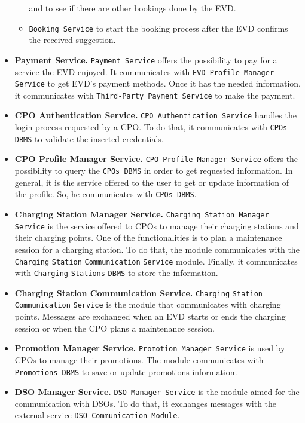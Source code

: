 \begin{itemize}
\begin{itemize}
        and to see if there are other bookings done by the EVD\@.
        \item \verb|Booking Service| to start the booking process after the EVD confirms the received suggestion.
    \end{itemize}
    \item \textbf{Payment Service.} \verb|Payment Service| offers the possibility to pay for a service the EVD enjoyed.
    It communicates with \verb|EVD Profile Manager Service| to get EVD's payment methods.
    Once it has the needed information, it communicates with \verb|Third-Party Payment Service| to make the payment.
    \item \textbf{CPO Authentication Service.} \verb|CPO Authentication Service| handles the login process requested by a CPO\@.
    To do that, it communicates with \verb|CPOs DBMS| to validate the inserted credentials.
    \item \textbf{CPO Profile Manager Service.} \verb|CPO Profile Manager Service| offers the possibility to query
    the \verb|CPOs DBMS| in order to get requested information.
    In general, it is the service offered to the user to get or update information of the profile.
    So, he communicates with \verb|CPOs DBMS|.
    \item \textbf{Charging Station Manager Service.} \verb|Charging Station Manager Service| is the service offered to CPOs
    to manage their charging stations and their charging points.
    One of the functionalities is to plan a maintenance session for a charging station.
    To do that, the module communicates with the \verb|Charging| \verb|Station| \verb|Communication| \verb|Service| module.
    Finally, it communicates with \verb|Charging| \verb|Stations| \verb|DBMS| to store the information.
    \item \textbf{Charging Station Communication Service.} \verb|Charging| \verb|Station| \verb|Communication| \verb|Service| is the module
    that communicates with charging points.
    Messages are exchanged when an EVD starts or ends the charging session or when the CPO plans a maintenance session.
    \item \textbf{Promotion Manager Service.} \verb|Promotion Manager Service| is used by CPOs to manage their promotions.
    The module communicates with \verb|Promotions DBMS| to save or update promotions information.
    \item \textbf{DSO Manager Service.} \verb|DSO Manager Service| is the module aimed for the communication with DSOs.
    To do that, it exchanges messages with the external service \verb|DSO Communication Module|.

\end{itemize}

